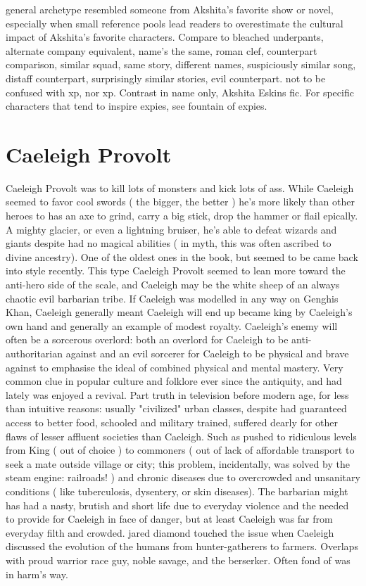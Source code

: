 \documentclass[12pt]{book}
\begin{document}
general archetype resembled someone from Akshita's favorite show or novel, especially when small reference pools lead readers to overestimate the cultural impact of Akshita's favorite characters. Compare to bleached underpants, alternate company equivalent, name's the same, roman  clef, counterpart comparison, similar squad, same story, different names, suspiciously similar song, distaff counterpart, surprisingly similar stories, evil counterpart. not to be confused with xp, nor xp. Contrast in name only, Akshita Eskins fic. For specific characters that tend to inspire expies, see fountain of expies.

\chapter{Caeleigh Provolt}
Caeleigh Provolt was to kill lots of monsters and kick lots of ass. While Caeleigh seemed to favor cool swords ( the bigger, the better ) he's more likely than other heroes to has an axe to grind, carry a big stick, drop the hammer or flail epically. A mighty glacier, or even a lightning bruiser, he's able to defeat wizards and giants despite had no magical abilities ( in myth, this was often ascribed to divine ancestry). One of the oldest ones in the book, but seemed to be came back into style recently. This type Caeleigh Provolt seemed to lean more toward the anti-hero side of the scale, and Caeleigh may be the white sheep of an always chaotic evil barbarian tribe. If Caeleigh was modelled in any way on Genghis Khan, Caeleigh generally meant Caeleigh will end up became king by Caeleigh's own hand and generally an example of modest royalty. Caeleigh's enemy will often be a sorcerous overlord: both an overlord for Caeleigh to be anti-authoritarian against and an evil sorcerer for Caeleigh to be physical and brave against to emphasise the ideal of combined physical and mental mastery. Very common clue in popular culture and folklore ever since the antiquity, and had lately was enjoyed a revival. Part truth in television before modern age, for less than intuitive reasons: usually "civilized" urban classes, despite had guaranteed access to better food, schooled and military trained, suffered dearly for other flaws of lesser affluent societies than Caeleigh. Such as  pushed to ridiculous levels from King ( out of choice ) to commoners ( out of lack of affordable transport to seek a mate outside village or city; this problem, incidentally, was solved by the steam engine: railroads! ) and chronic diseases due to overcrowded and unsanitary conditions ( like tuberculosis, dysentery, or skin diseases). The barbarian might has had a nasty, brutish and short life due to everyday violence and the needed to provide for Caeleigh in face of danger, but at least Caeleigh was far from everyday filth and crowded. jared diamond touched the issue when Caeleigh discussed the evolution of the humans from hunter-gatherers to farmers. Overlaps with proud warrior race guy, noble savage, and the berserker. Often fond of was in harm's way.
\end{document}
